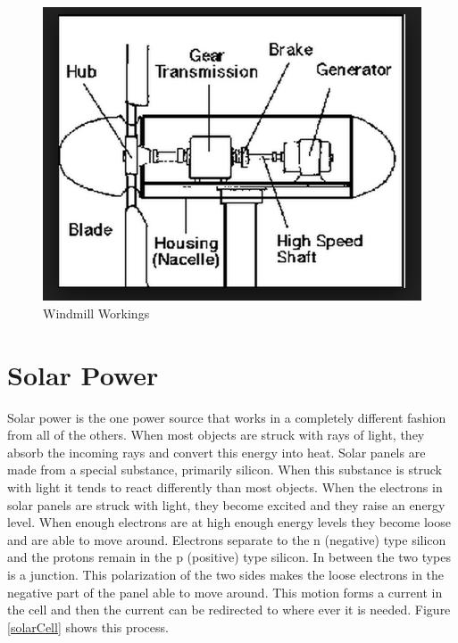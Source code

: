 \documentclass[msc,oneside]{ubcthesis}%
\begin{document}
\begin{figure}[hbt]\label{windmillWorkings}
  \begin{center}
    \includegraphics[width=1\textwidth]{windmill}
    \caption[Windmill Workings]{Windmill Workings \cite{Wind}}
  \end{center}
\end{figure}

\newpage

\section{Solar Power}
Solar power is the one power source that works in a completely different fashion from all of the others. When most objects are struck with rays of light, they absorb the incoming rays and convert this energy into heat. Solar panels are made from a special substance, primarily silicon. When this substance is struck with light it tends to react differently than most objects. When the electrons in solar panels are 
struck with light, they become excited and they raise an energy level. When enough electrons are at high enough energy levels they become loose and are able to move around. Electrons separate to the n (negative) type silicon and the protons remain in the p (positive) type silicon. In between the two types is a junction. This polarization of the two sides makes the loose electrons in the negative part of the panel able to move around. This motion forms a current in the cell and then the current can be redirected to where ever it is needed. Figure 
\ref{solarCell} shows this process. 
\end{document}

